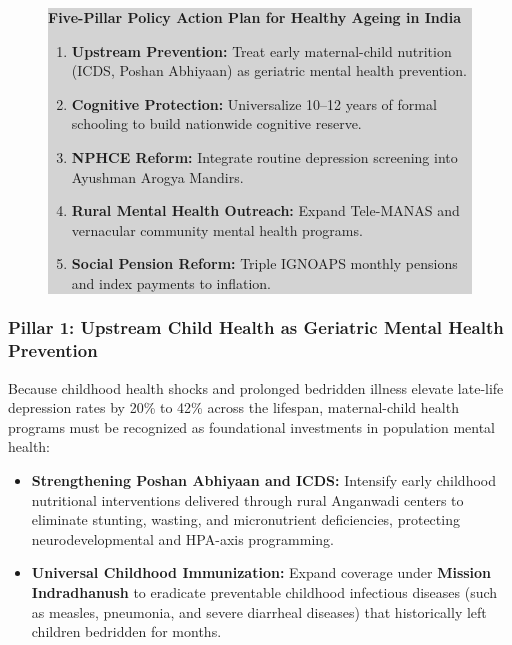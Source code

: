 \begin{figure}[!htbp]
    \centering
    \begin{minipage}{0.95\textwidth}
        \colorbox{lightgrey}{
            \parbox{\textwidth}{
                \vspace{0.3cm}
                \centering \large \bfseries \color{navyblue} Five-Pillar Policy Action Plan for Healthy Ageing in India
                \vspace{0.2cm}
                \normalsize \color{black}
                \begin{enumerate}[leftmargin=1.5cm]
                    \item \textbf{Upstream Prevention:} Treat early maternal-child nutrition (ICDS, Poshan Abhiyaan) as geriatric mental health prevention.
                    \item \textbf{Cognitive Protection:} Universalize 10--12 years of formal schooling to build nationwide cognitive reserve.
                    \item \textbf{NPHCE Reform:} Integrate routine depression screening into Ayushman Arogya Mandirs.
                    \item \textbf{Rural Mental Health Outreach:} Expand Tele-MANAS and vernacular community mental health programs.
                    \item \textbf{Social Pension Reform:} Triple IGNOAPS monthly pensions and index payments to inflation.
                \end{enumerate}
                \vspace{0.2cm}
            }
        }
    \end{minipage}
\end{figure}

\subsubsection{Pillar 1: Upstream Child Health as Geriatric Mental Health Prevention}
Because childhood health shocks and prolonged bedridden illness elevate late-life depression rates by 20\% to 42\% across the lifespan, maternal-child health programs must be recognized as foundational investments in population mental health:
\begin{itemize}
    \item \textbf{Strengthening Poshan Abhiyaan and ICDS:} Intensify early childhood nutritional interventions delivered through rural Anganwadi centers to eliminate stunting, wasting, and micronutrient deficiencies, protecting neurodevelopmental and HPA-axis programming.
    \item \textbf{Universal Childhood Immunization:} Expand coverage under \textbf{Mission Indradhanush} to eradicate preventable childhood infectious diseases (such as measles, pneumonia, and severe diarrheal diseases) that historically left children bedridden for months.
\end{itemize}

